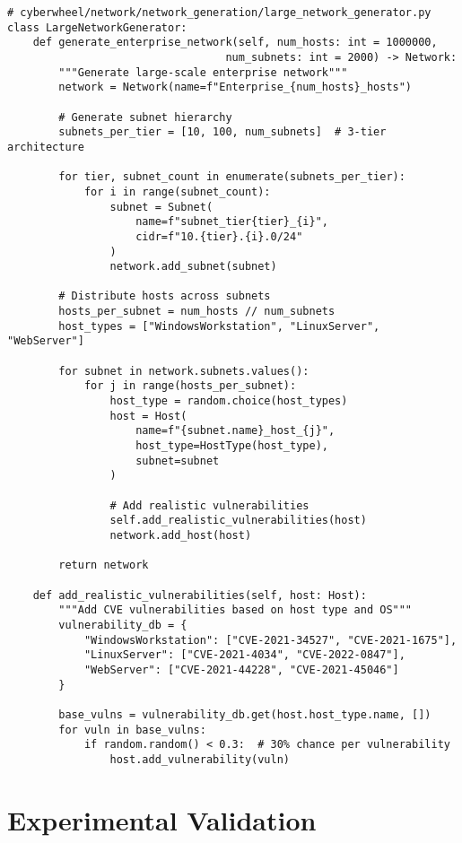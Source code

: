 \documentclass[12pt,a4paper]{article}
\begin{document}
\begin{lstlisting}[caption=Large Network Generation]
# cyberwheel/network/network_generation/large_network_generator.py
class LargeNetworkGenerator:
    def generate_enterprise_network(self, num_hosts: int = 1000000,
                                  num_subnets: int = 2000) -> Network:
        """Generate large-scale enterprise network"""
        network = Network(name=f"Enterprise_{num_hosts}_hosts")
        
        # Generate subnet hierarchy
        subnets_per_tier = [10, 100, num_subnets]  # 3-tier architecture
        
        for tier, subnet_count in enumerate(subnets_per_tier):
            for i in range(subnet_count):
                subnet = Subnet(
                    name=f"subnet_tier{tier}_{i}",
                    cidr=f"10.{tier}.{i}.0/24"
                )
                network.add_subnet(subnet)
        
        # Distribute hosts across subnets
        hosts_per_subnet = num_hosts // num_subnets
        host_types = ["WindowsWorkstation", "LinuxServer", "WebServer"]
        
        for subnet in network.subnets.values():
            for j in range(hosts_per_subnet):
                host_type = random.choice(host_types)
                host = Host(
                    name=f"{subnet.name}_host_{j}",
                    host_type=HostType(host_type),
                    subnet=subnet
                )
                
                # Add realistic vulnerabilities
                self.add_realistic_vulnerabilities(host)
                network.add_host(host)
        
        return network
    
    def add_realistic_vulnerabilities(self, host: Host):
        """Add CVE vulnerabilities based on host type and OS"""
        vulnerability_db = {
            "WindowsWorkstation": ["CVE-2021-34527", "CVE-2021-1675"],
            "LinuxServer": ["CVE-2021-4034", "CVE-2022-0847"],
            "WebServer": ["CVE-2021-44228", "CVE-2021-45046"]
        }
        
        base_vulns = vulnerability_db.get(host.host_type.name, [])
        for vuln in base_vulns:
            if random.random() < 0.3:  # 30% chance per vulnerability
                host.add_vulnerability(vuln)
\end{lstlisting}

\section{Experimental Validation}
\end{document}
